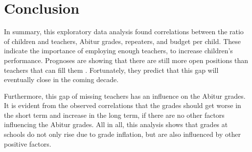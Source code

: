 \section{Conclusion}
In summary, this exploratory data analysis found correlations between the ratio of children and teachers, Abitur grades, repeaters, and budget per child. These indicate the importance of employing enough teachers, to increase children's performance. Prognoses are  showing that there are still more open positions than teachers that can fill them \cite{kultusminister_konferenz_lehrkrafteeinstellungsbedarf_2023}. Fortunately, they predict that this gap will eventually close in the coming decade. 

Furthermore, this gap of missing teachers has an influence on the Abitur grades. It is evident from the observed correlations that the grades should get worse in the short term and increase in the long term, if there are no other factors influencing the Abitur grades. All in all, this analysis shows that grades at schools do not only rise due to grade inflation, but are also influenced by other positive factors.



